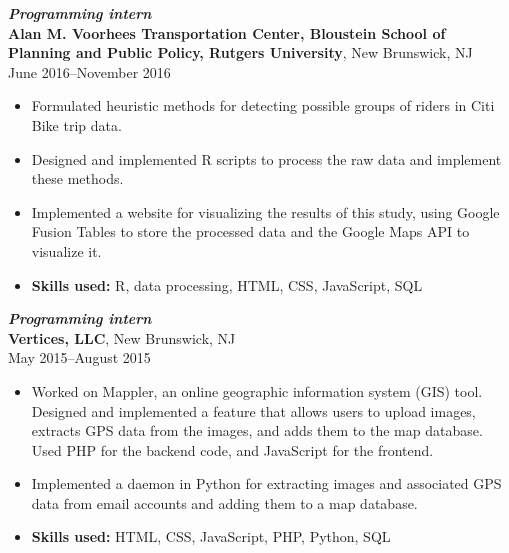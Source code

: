 \documentclass[letterpaper,12pt]{article}
\begin{document}
\iffalse
\textit{\textbf{Independent mathematics tutor}} \\
\textbf{Mercer County Community College},
West Windsor, NJ \\
May 2017--July 2017
\begin{itemize}
\item Established an independent tutoring service.
\item Tutored students from Mercer County Community College in
  mathematics (mainly calculus and precalculus).
\end{itemize}
\fi

\iffalse
\textit{\textbf{Programming intern}} \\
\textbf{Alan M. Voorhees Transportation Center, Bloustein School of
  Planning and Public Policy, Rutgers University},
New Brunswick, NJ \\
June 2016--November 2016
\begin{itemize}
\item Formulated heuristic methods for detecting possible groups of
  riders in Citi Bike trip data.
\item Designed and implemented R scripts to process the raw data and
  implement these methods.

\item Implemented a website for visualizing the results of this study,
  using Google Fusion Tables to store the processed data and the
  Google Maps API to visualize it.

\item \textbf{Skills used:} R, data processing, HTML, CSS, JavaScript,
  SQL
\end{itemize}

\textit{\textbf{Programming intern}} \\
\textbf{Vertices, LLC}, New Brunswick, NJ \\
May 2015--August 2015
\begin{itemize}
\item Worked on Mappler, an online geographic information system (GIS)
  tool. Designed and implemented a feature that allows users to upload
  images, extracts GPS data from the images, and adds them to the map
  database. Used PHP for the backend code, and JavaScript for the
  frontend.
\item Implemented a daemon in Python for extracting images and
  associated GPS data from email accounts and adding them to a map
  database.
\item \textbf{Skills used:} HTML, CSS, JavaScript, PHP, Python, SQL
\end{itemize}
\end{document}
